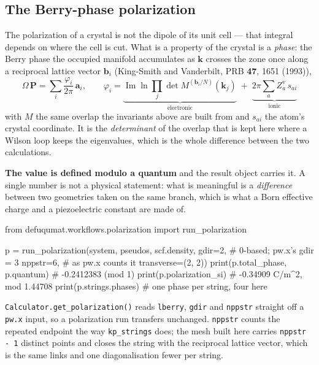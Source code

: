 \documentclass[11pt,a4paper]{article}
\newcommand{\code}[1]{\texttt{\small #1}}
\begin{document}
\subsection{The Berry-phase polarization}

The polarization of a crystal is not the dipole of its unit cell --- that
integral depends on where the cell is cut. What is a property of the crystal is
a \emph{phase}: the Berry phase the occupied manifold accumulates as $\mathbf k$
crosses the zone once along a reciprocal lattice vector $\mathbf b_i$
(King-Smith and Vanderbilt, PRB \textbf{47}, 1651 (1993)),
\begin{equation*}
  \Omega\,\mathbf P = \sum_i \frac{\varphi_i}{2\pi}\,\mathbf a_i,
  \qquad
  \varphi_i = \underbrace{\operatorname{Im}\ln \prod_{j}
    \det M^{(\mathbf b_i/N)}(\mathbf k_j)}_{\text{electronic}}
  \;+\; \underbrace{2\pi\sum_a Z^{\mathrm v}_a\, s_{a i}}_{\text{ionic}}
\end{equation*}
with $M$ the same overlap the invariants above are built from and $s_{ai}$ the
atom's crystal coordinate. It is the \emph{determinant} of the overlap that is
kept here where a Wilson loop keeps the eigenvalues, which is the whole
difference between the two calculations.

\textbf{The value is defined modulo a quantum} and the result object carries it.
A single number is not a physical statement: what is meaningful is a
\emph{difference} between two geometries taken on the same branch, which is what
a Born effective charge and a piezoelectric constant are made of.

\begin{pycode}
from defuqumat.workflows.polarization import run_polarization

p = run_polarization(system, pseudos, scf.density,
                     gdir=2,            # 0-based; pw.x's gdir = 3
                     nppstr=6,          # as pw.x counts it
                     transverse=(2, 2))
print(p.total_phase, p.quantum)         # -0.2412383  (mod 1)
print(p.polarization_si)                # -0.34909 C/m^2, mod 1.44708
print(p.strings.phases)                 # one phase per string, four here
\end{pycode}

\code{Calculator.get\_polarization()} reads \code{lberry}, \code{gdir} and
\code{nppstr} straight off a \code{pw.x} input, so a polarization run transfers
unchanged. \code{nppstr} counts the repeated endpoint the way \code{kp\_strings}
does; the mesh built here carries \code{nppstr - 1} distinct points and closes
the string with the reciprocal lattice vector, which is the same links and one
diagonalisation fewer per string.
\end{document}
